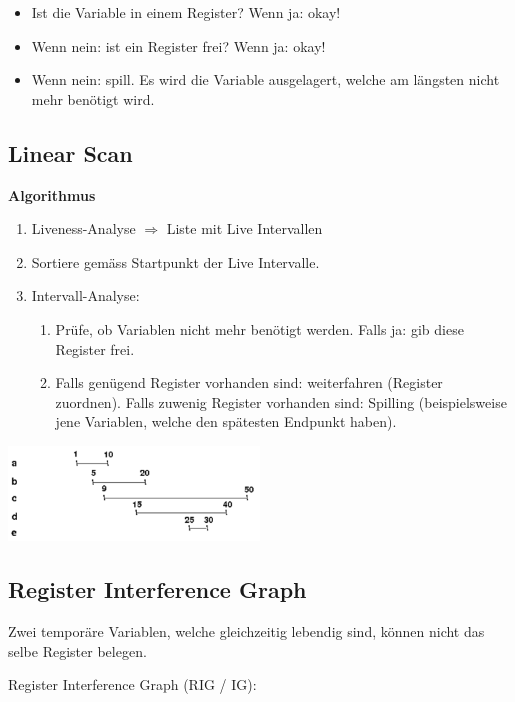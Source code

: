 \begin{itemize}
	\item Ist die Variable in einem Register? Wenn ja: okay!
	\item Wenn nein: ist ein Register frei? Wenn ja: okay!
	\item Wenn nein: spill. Es wird die Variable ausgelagert, welche am längsten
		nicht mehr benötigt wird.
\end{itemize}


\subsection{Linear Scan}

\textbf{Algorithmus}

\begin{enumerate}
	\item Liveness-Analyse $\Rightarrow$ Liste mit Live Intervallen
	\item Sortiere gemäss Startpunkt der Live Intervalle.
	\item Intervall-Analyse:
	\begin{enumerate}
		\item Prüfe, ob Variablen nicht mehr benötigt werden. Falls ja: gib diese
			Register frei.
		\item Falls genügend Register vorhanden sind: weiterfahren (Register
			zuordnen). Falls zuwenig Register vorhanden sind: Spilling (beispielsweise
			jene Variablen, welche den spätesten Endpunkt haben).
	\end{enumerate}
\end{enumerate}

\hspace{15mm} \includegraphics[width=0.5\textwidth]{images/liveness}


\subsection{Register Interference Graph}
\label{subsec:rig}

Zwei temporäre Variablen, welche gleichzeitig lebendig sind, können nicht das
selbe Register belegen.

Register Interference Graph (RIG / IG):

